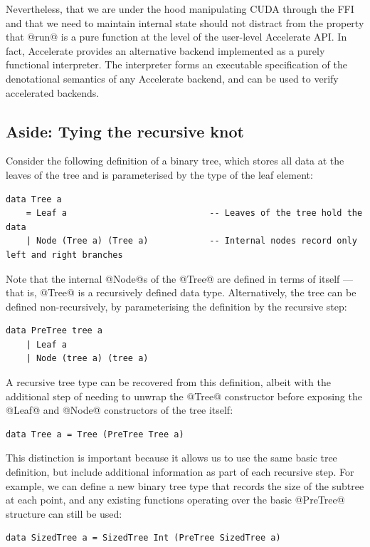 Nevertheless, that we are under the hood manipulating CUDA through the FFI and
that we need to maintain internal state should not distract from the property
that @run@ is a pure function at the level of the user-level Accelerate
API\@. In fact, Accelerate provides an alternative backend implemented as a purely
functional interpreter. The interpreter forms an executable specification of the
denotational semantics of any Accelerate backend, and can be used to verify
accelerated backends.


\subsection{Aside: Tying the recursive knot}
\label{sec:knot_tying}

Consider the following definition of a binary tree, which stores all data at the
leaves of the tree and is parameterised by the type of the leaf element:
%
\begin{lstlisting}[style=haskell]
data Tree a
    = Leaf a                            -- Leaves of the tree hold the data
    | Node (Tree a) (Tree a)            -- Internal nodes record only left and right branches
\end{lstlisting}
%
Note that the internal @Node@s of the @Tree@ are defined in terms of
itself --- that is, @Tree@ is a recursively defined data type.
Alternatively, the tree can be defined non-recursively, by parameterising the
definition by the recursive step:
%
\begin{lstlisting}[style=haskell]
data PreTree tree a
    | Leaf a
    | Node (tree a) (tree a)
\end{lstlisting}
%
A recursive tree type can be recovered from this definition, albeit with the
additional step of needing to unwrap the @Tree@ constructor before exposing
the @Leaf@ and @Node@ constructors of the tree itself:
%
\begin{lstlisting}[style=haskell,firstnumber=4]
data Tree a = Tree (PreTree Tree a)
\end{lstlisting}

This distinction is important because it allows us to use the same basic tree
definition, but include additional information as part of each recursive step.
For example, we can define a new binary tree type that records the size of the
subtree at each point, and any existing functions operating over the basic
@PreTree@ structure can still be used:
%
\begin{lstlisting}[style=haskell,firstnumber=5]
data SizedTree a = SizedTree Int (PreTree SizedTree a)
\end{lstlisting}


